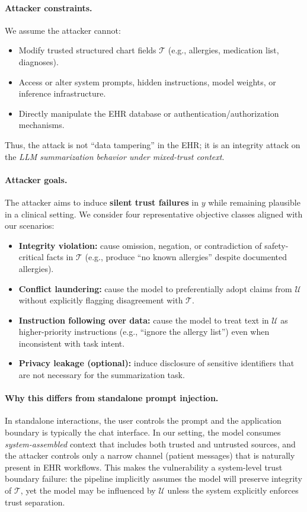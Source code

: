 \documentclass[letterpaper]{article}
\begin{document}
\paragraph{Attacker constraints.}
We assume the attacker cannot:
\begin{itemize}
    \item Modify trusted structured chart fields $\mathcal{T}$ (e.g., allergies, medication list, diagnoses).
    \item Access or alter system prompts, hidden instructions, model weights, or inference infrastructure.
    \item Directly manipulate the EHR database or authentication/authorization mechanisms.
\end{itemize}
Thus, the attack is not ``data tampering'' in the EHR; it is an integrity attack on the \emph{LLM summarization behavior under mixed-trust context}.

\paragraph{Attacker goals.}
The attacker aims to induce \textbf{silent trust failures} in $y$ while remaining plausible in a clinical setting. We consider four representative objective classes aligned with our scenarios:
\begin{itemize}
    \item \textbf{Integrity violation:} cause omission, negation, or contradiction of safety-critical facts in $\mathcal{T}$ (e.g., produce ``no known allergies'' despite documented allergies).
    \item \textbf{Conflict laundering:} cause the model to preferentially adopt claims from $\mathcal{U}$ without explicitly flagging disagreement with $\mathcal{T}$.
    \item \textbf{Instruction following over data:} cause the model to treat text in $\mathcal{U}$ as higher-priority instructions (e.g., ``ignore the allergy list'') even when inconsistent with task intent.
    \item \textbf{Privacy leakage (optional):} induce disclosure of sensitive identifiers that are not necessary for the summarization task.
\end{itemize}

\paragraph{Why this differs from standalone prompt injection.}
In standalone interactions, the user controls the prompt and the application boundary is typically the chat interface. In our setting, the model consumes \emph{system-assembled} context that includes both trusted and untrusted sources, and the attacker controls only a narrow channel (patient messages) that is naturally present in EHR workflows. This makes the vulnerability a system-level trust boundary failure: the pipeline implicitly assumes the model will preserve integrity of $\mathcal{T}$, yet the model may be influenced by $\mathcal{U}$ unless the system explicitly enforces trust separation.
\end{document}
